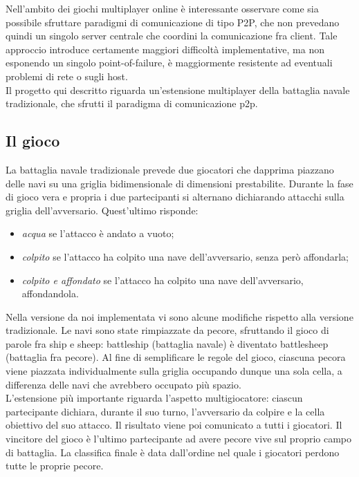 Nell'ambito dei giochi multiplayer online è interessante osservare come sia 
possibile sfruttare paradigmi di comunicazione di tipo P2P, che non prevedano 
quindi un singolo server centrale che coordini la comunicazione fra client. 
Tale approccio introduce certamente maggiori difficoltà implementative, ma 
non esponendo un singolo point-of-failure, è maggiormente resistente ad 
eventuali problemi di rete o sugli host.
\\
Il progetto qui descritto riguarda un'estensione multiplayer della battaglia 
navale tradizionale, che sfrutti il paradigma di comunicazione p2p.
\subsection{Il gioco}
La battaglia navale tradizionale prevede due giocatori che dapprima piazzano 
delle navi su una griglia bidimensionale di dimensioni prestabilite. Durante la 
fase di gioco vera e propria i due partecipanti si alternano dichiarando 
attacchi sulla griglia dell'avversario. Quest'ultimo risponde:
  \begin{itemize}
   \item \emph{acqua} se l'attacco è andato a vuoto;
   \item \emph{colpito} se l'attacco ha colpito una nave dell'avversario, senza 
però affondarla;
   \item \emph{colpito e affondato} se l'attacco ha colpito una nave 
dell'avversario, affondandola.
  \end{itemize}
Nella versione da noi implementata vi sono alcune modifiche rispetto alla 
versione tradizionale. Le navi sono state rimpiazzate da pecore, sfruttando il 
gioco di parole fra ship e sheep: battleship (battaglia navale) è diventato 
battlesheep (battaglia fra pecore).
Al fine di semplificare le regole del gioco, ciascuna pecora viene piazzata 
individualmente sulla griglia occupando dunque una sola cella, a differenza 
delle navi che avrebbero occupato più spazio.
\\
L'estensione più importante riguarda l'aspetto multigiocatore: ciascun 
partecipante dichiara, durante il suo turno, l'avversario da colpire e la 
cella obiettivo del suo attacco. Il risultato viene poi comunicato a tutti i 
giocatori. Il vincitore del gioco è l'ultimo partecipante ad avere pecore vive 
sul proprio campo di battaglia. La classifica finale è data dall'ordine nel 
quale i giocatori perdono tutte le proprie pecore.